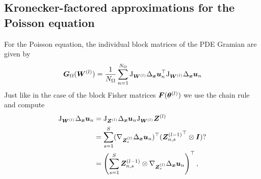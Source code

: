 \subsection{Kronecker-factored approximations for the Poisson equation}
For the Poisson equation, the individual block matrices of the PDE Gramian are given by
\begin{align}
    {\bm{G}}_\Omega({\bm{W}}^{(l)}) = \frac1{{N_\Omega}} \sum_{n=1}^{N_\Omega} \mathrm{J}_{{\bm{W}}^{(l)}} \Delta_{\bm{x}} {\bm{u}}_n^\top \mathrm{J}_{{\bm{W}}^{(l)}} \Delta_{\bm{x}} {\bm{u}}_n
\end{align}
Just like in the case of the block Fisher matrices ${\bm{F}}({\bm{\theta}}^{(l)})$ we use the chain rule and compute
\begin{align*}
    \jac_{\mW^{(l)}} \Delta_\vx \vu_n & = \jac_{\mZ^{(l)}}\Delta_\vx \vu_n \jac_{\mW^{(l)}} \mZ^{(l)} %
    \\ & = \sum_{s=1}^S (\nabla_{\mZ^{(l)}_s} \Delta_{\vx}\vu_n)^\top  ({\mZ^{(l-1)}_{n,s}}^\top \otimes \mI)?
    \\ & = \left(\sum_{s=1}^S \mZ^{(l-1)}_{n,s} \otimes \nabla_{\mZ^{(l)}_s} \Delta_{\vx}\vu_n\right)^\top,
\end{align*}
